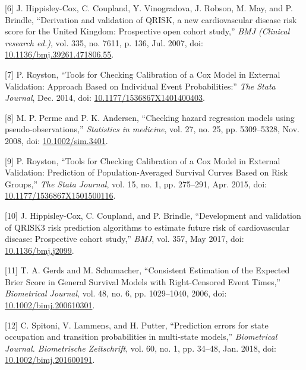 \documentclass[
]{article}
\newenvironment{cslreferences}%
  {}%
  {\par}
\begin{document}
\begin{cslreferences}
\leavevmode\hypertarget{ref-hippisley-cox_derivation_2007}{}%
{[}6{]} J. Hippisley-Cox, C. Coupland, Y. Vinogradova, J. Robson, M. May, and P. Brindle, ``Derivation and validation of QRISK, a new cardiovascular disease risk score for the United Kingdom: Prospective open cohort study,'' \emph{BMJ (Clinical research ed.)}, vol. 335, no. 7611, p. 136, Jul. 2007, doi: \href{https://doi.org/10.1136/bmj.39261.471806.55}{10.1136/bmj.39261.471806.55}.

\leavevmode\hypertarget{ref-royston_tools_2014}{}%
{[}7{]} P. Royston, ``Tools for Checking Calibration of a Cox Model in External Validation: Approach Based on Individual Event Probabilities:'' \emph{The Stata Journal}, Dec. 2014, doi: \href{https://doi.org/10.1177/1536867X1401400403}{10.1177/1536867X1401400403}.

\leavevmode\hypertarget{ref-perme_checking_2008}{}%
{[}8{]} M. P. Perme and P. K. Andersen, ``Checking hazard regression models using pseudo-observations,'' \emph{Statistics in medicine}, vol. 27, no. 25, pp. 5309--5328, Nov. 2008, doi: \href{https://doi.org/10.1002/sim.3401}{10.1002/sim.3401}.

\leavevmode\hypertarget{ref-royston_tools_2015}{}%
{[}9{]} P. Royston, ``Tools for Checking Calibration of a Cox Model in External Validation: Prediction of Population-Averaged Survival Curves Based on Risk Groups,'' \emph{The Stata Journal}, vol. 15, no. 1, pp. 275--291, Apr. 2015, doi: \href{https://doi.org/10.1177/1536867X1501500116}{10.1177/1536867X1501500116}.

\leavevmode\hypertarget{ref-hippisley-cox_development_2017}{}%
{[}10{]} J. Hippisley-Cox, C. Coupland, and P. Brindle, ``Development and validation of QRISK3 risk prediction algorithms to estimate future risk of cardiovascular disease: Prospective cohort study,'' \emph{BMJ}, vol. 357, May 2017, doi: \href{https://doi.org/10.1136/bmj.j2099}{10.1136/bmj.j2099}.

\leavevmode\hypertarget{ref-gerds_consistent_2006}{}%
{[}11{]} T. A. Gerds and M. Schumacher, ``Consistent Estimation of the Expected Brier Score in General Survival Models with Right-Censored Event Times,'' \emph{Biometrical Journal}, vol. 48, no. 6, pp. 1029--1040, 2006, doi: \href{https://doi.org/10.1002/bimj.200610301}{10.1002/bimj.200610301}.

\leavevmode\hypertarget{ref-spitoni_prediction_2018}{}%
{[}12{]} C. Spitoni, V. Lammens, and H. Putter, ``Prediction errors for state occupation and transition probabilities in multi-state models,'' \emph{Biometrical Journal. Biometrische Zeitschrift}, vol. 60, no. 1, pp. 34--48, Jan. 2018, doi: \href{https://doi.org/10.1002/bimj.201600191}{10.1002/bimj.201600191}.


\end{cslreferences}
\end{document}
